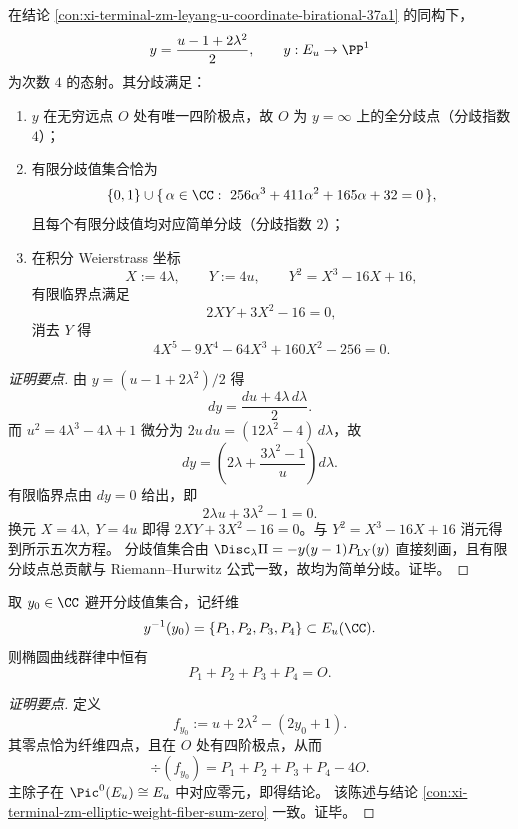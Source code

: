 \begin{conclusion}[分歧剖分与积分坐标下的临界五次方程]\label{con:xi-terminal-zm-leyang-u-coordinate-ramification-integral-quintic}
在结论 \ref{con:xi-terminal-zm-leyang-u-coordinate-birational-37a1} 的同构下，
\[
y=\frac{u-1+2\lambda^2}{2},\qquad y:E_u\to\PP^1
\]
为次数 \(4\) 的态射。其分歧满足：
\begin{enumerate}
  \item \(y\) 在无穷远点 \(O\) 处有唯一四阶极点，故 \(O\) 为 \(y=\infty\) 上的全分歧点（分歧指数 \(4\)）；
  \item 有限分歧值集合恰为
  \[
  \{0,1\}\cup\{\,\alpha\in\CC:\ 256\alpha^3+411\alpha^2+165\alpha+32=0\,\},
  \]
  且每个有限分歧值均对应简单分歧（分歧指数 \(2\)）；
  \item 在积分 Weierstrass 坐标
  \[
  X:=4\lambda,\qquad Y:=4u,\qquad Y^2=X^3-16X+16,
  \]
  有限临界点满足
  \[
  2XY+3X^2-16=0,
  \]
  消去 \(Y\) 得
  \[
  4X^5-9X^4-64X^3+160X^2-256=0.
  \]
\end{enumerate}
\end{conclusion}
\begin{proof}[证明要点]
由 \(y=(u-1+2\lambda^2)/2\) 得
\[
dy=\frac{du+4\lambda\,d\lambda}{2}.
\]
而 \(u^2=4\lambda^3-4\lambda+1\) 微分为 \(2u\,du=(12\lambda^2-4)\,d\lambda\)，故
\[
dy=\left(2\lambda+\frac{3\lambda^2-1}{u}\right)d\lambda.
\]
有限临界点由 \(dy=0\) 给出，即
\[
2\lambda u+3\lambda^2-1=0.
\]
换元 \(X=4\lambda,\ Y=4u\) 即得 \(2XY+3X^2-16=0\)。与 \(Y^2=X^3-16X+16\) 消元得到所示五次方程。
分歧值集合由 \(\Disc_\lambda\Pi=-y(y-1)P_{\mathrm{LY}}(y)\) 直接刻画，且有限分歧点总贡献与 Riemann--Hurwitz 公式一致，故均为简单分歧。证毕。
\end{proof}

\begin{conclusion}[非分歧纤维四点零和]\label{con:xi-terminal-zm-leyang-u-coordinate-fiber-fourpoint-zero-sum}
取 \(y_0\in\CC\) 避开分歧值集合，记纤维
\[
y^{-1}(y_0)=\{P_1,P_2,P_3,P_4\}\subset E_u(\CC).
\]
则椭圆曲线群律中恒有
\[
P_1+P_2+P_3+P_4=O.
\]
\end{conclusion}
\begin{proof}[证明要点]
定义
\[
f_{y_0}:=u+2\lambda^2-(2y_0+1).
\]
其零点恰为纤维四点，且在 \(O\) 处有四阶极点，从而
\[
\div(f_{y_0})=P_1+P_2+P_3+P_4-4O.
\]
主除子在 \(\Pic^0(E_u)\cong E_u\) 中对应零元，即得结论。
该陈述与结论 \ref{con:xi-terminal-zm-elliptic-weight-fiber-sum-zero} 一致。证毕。
\end{proof}

